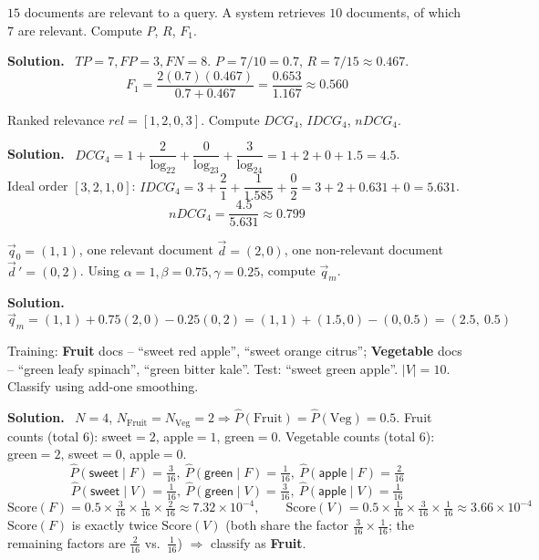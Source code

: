 \documentclass[11pt, a4paper]{article}
\newcommand{\Solution}{\medskip\noindent\textbf{\color{exgreen}Solution.}\ }
\begin{document}
\begin{exercisebox}
$15$ documents are relevant to a query. A system retrieves $10$ documents, of which $7$ are relevant. Compute $P$, $R$, $F_1$.
\end{exercisebox}
\Solution
$TP=7,FP=3,FN=8$. $P=7/10=0.7$, $R=7/15\approx0.467$.
\[
F_1 = \frac{2(0.7)(0.467)}{0.7+0.467} = \frac{0.653}{1.167} \approx 0.560
\]

\begin{exercisebox}
Ranked relevance $rel=[1,2,0,3]$. Compute $DCG_4$, $IDCG_4$, $nDCG_4$.
\end{exercisebox}
\Solution
$DCG_4 = 1+\dfrac{2}{\log_22}+\dfrac{0}{\log_23}+\dfrac{3}{\log_24} = 1+2+0+1.5=4.5$.\\
Ideal order $[3,2,1,0]$: $IDCG_4 = 3+\dfrac{2}{1}+\dfrac{1}{1.585}+\dfrac{0}{2} = 3+2+0.631+0=5.631$.
\[
nDCG_4 = \frac{4.5}{5.631} \approx 0.799
\]

\begin{exercisebox}
$\vec q_0=(1,1)$, one relevant document $\vec d=(2,0)$, one non-relevant document $\vec d\,'=(0,2)$. Using $\alpha=1,\beta=0.75,\gamma=0.25$, compute $\vec q_m$.
\end{exercisebox}
\Solution
\[
\vec q_m = (1,1) + 0.75(2,0) - 0.25(0,2) = (1,1)+(1.5,0)-(0,0.5) = (2.5,\ 0.5)
\]

\begin{exercisebox}
Training: \textbf{Fruit} docs -- ``sweet red apple'', ``sweet orange citrus''; \textbf{Vegetable} docs -- ``green leafy spinach'', ``green bitter kale''. Test: ``sweet green apple''. $|V|=10$. Classify using add-one smoothing.
\end{exercisebox}
\Solution
$N=4$, $N_{\text{Fruit}}=N_{\text{Veg}}=2 \Rightarrow \hat P(\text{Fruit})=\hat P(\text{Veg})=0.5$. Fruit counts (total $6$): sweet$=2$, apple$=1$, green$=0$. Vegetable counts (total $6$): green$=2$, sweet$=0$, apple$=0$.
\[
\hat P(\textsf{sweet}\mid F)=\tfrac{3}{16},\ \hat P(\textsf{green}\mid F)=\tfrac{1}{16},\ \hat P(\textsf{apple}\mid F)=\tfrac{2}{16}
\]
\[
\hat P(\textsf{sweet}\mid V)=\tfrac{1}{16},\ \hat P(\textsf{green}\mid V)=\tfrac{3}{16},\ \hat P(\textsf{apple}\mid V)=\tfrac{1}{16}
\]
\[
\text{Score}(F) = 0.5\times\tfrac{3}{16}\times\tfrac{1}{16}\times\tfrac{2}{16} \approx 7.32\times10^{-4}, \qquad
\text{Score}(V) = 0.5\times\tfrac{1}{16}\times\tfrac{3}{16}\times\tfrac{1}{16} \approx 3.66\times10^{-4}
\]
$\text{Score}(F)$ is exactly twice $\text{Score}(V)$ (both share the factor $\tfrac{3}{16}\times\tfrac1{16}$; the remaining factors are $\tfrac{2}{16}$ vs.\ $\tfrac1{16}$) $\Rightarrow$ classify as \textbf{Fruit}.
\end{document}
